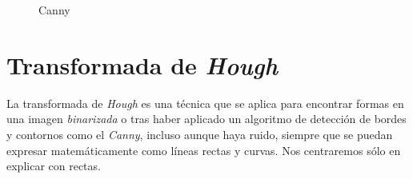 \begin{figure}[H]
  \centering \setlength\fboxsep{0pt} \setlength\fboxrule{0.5pt}
  \caption{Canny}
\end{figure}

\section{Transformada de \emph{Hough}}\label{tecnica:hough}
La transformada de \emph{Hough} \emph{\citep*[Use of the hough
  trasformtion to detect lines and curves in pictures]{hart1971use}}
\emph{\citep*[4.3.2 Hough transforms]{szeliski2010computer}}
\emph{\citep*[5.2 Hough Transform]{toennies2012guide}} es una técnica
que se aplica para encontrar formas en una imagen \emph{binarizada} o
tras haber aplicado un algoritmo de detección de bordes y contornos
como el \emph{Canny}, incluso aunque haya ruido, siempre que se puedan
expresar matemáticamente como líneas rectas y curvas. Nos centraremos
sólo en explicar con rectas.
